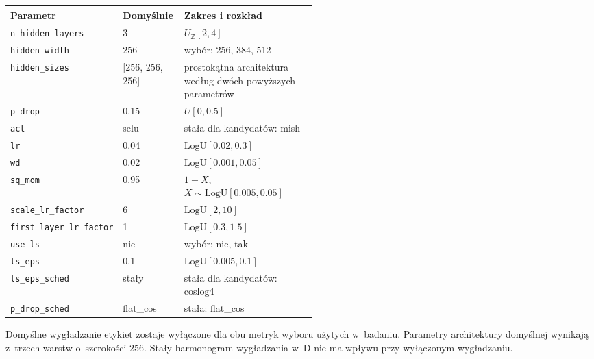\par\medskip\noindent\begin{minipage}{\linewidth}\captionsetup{hypcap=false}\centering\footnotesize
{}
\begin{tabularx}{\linewidth}{@{}P{0.32\linewidth}P{0.20\linewidth}Y@{}}
\toprule Parametr & Domyślnie & Zakres i rozkład \\
\midrule
\texttt{n\_hidden\_layers} & 3 & $U_{\mathbb Z}[2,4]$ \\
\texttt{hidden\_width} & 256 & wybór: 256, 384, 512 \\
\texttt{hidden\_sizes} & [256, 256, 256] & prostokątna architektura według dwóch powyższych parametrów \\
\texttt{p\_drop} & 0.15 & $U[0,0.5]$ \\
\texttt{act} & selu & stała dla kandydatów: mish \\
\texttt{lr} & 0.04 & $\mathrm{LogU}[0.02,0.3]$ \\
\texttt{wd} & 0.02 & $\mathrm{LogU}[0.001,0.05]$ \\
\texttt{sq\_mom} & 0.95 & $1-X$, $X\sim\mathrm{LogU}[0.005,0.05]$ \\
\texttt{scale\_lr\_factor} & 6 & $\mathrm{LogU}[2,10]$ \\
\texttt{first\_layer\_lr\_factor} & 1 & $\mathrm{LogU}[0.3,1.5]$ \\
\texttt{use\_ls} & nie & wybór: nie, tak \\
\texttt{ls\_eps} & 0.1 & $\mathrm{LogU}[0.005,0.1]$ \\
\texttt{ls\_eps\_sched} & stały & stała dla kandydatów: coslog4 \\
\texttt{p\_drop\_sched} & flat\_cos & stała: flat\_cos \\
\bottomrule\end{tabularx}\end{minipage}\par\medskip

Domyślne wygładzanie etykiet zostaje wyłączone dla obu metryk wyboru użytych w~badaniu. Parametry architektury domyślnej wynikają z~trzech warstw o~szerokości 256. Stały harmonogram wygładzania w~D nie ma wpływu przy wyłączonym wygładzaniu.

